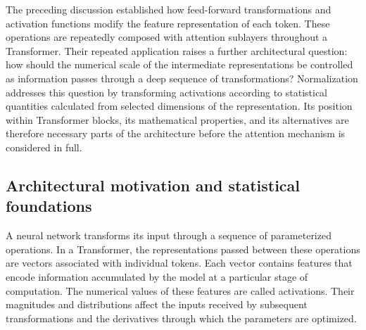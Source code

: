 %

The preceding discussion established how feed-forward transformations and
activation functions modify the feature representation of each token. These
operations are repeatedly composed with attention sublayers throughout a
Transformer. Their repeated application raises a further architectural
question: how should the numerical scale of the intermediate representations
be controlled as information passes through a deep sequence of transformations?
Normalization addresses this question by transforming activations according
to statistical quantities calculated from selected dimensions of the
representation. Its position within Transformer blocks, its mathematical
properties, and its alternatives are therefore necessary parts of the
architecture before the attention mechanism is considered in full.

\subsection{Architectural motivation and statistical foundations}
\label{subsec:norm-motivation-statistics}

A neural network transforms its input through a sequence of parameterized
operations. In a Transformer, the representations passed between these
operations are vectors associated with individual tokens. Each vector contains
features that encode information accumulated by the model at a particular
stage of computation. The numerical values of these features are called
activations. Their magnitudes and distributions affect the inputs received by
subsequent transformations and the derivatives through which the parameters
are optimized.

